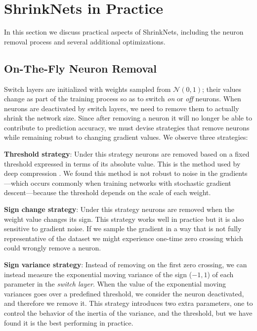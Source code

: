
\section{ShrinkNets in Practice}

In this section we discuss practical aspects of ShrinkNets, including the
neuron removal  process and several additional optimizations.

\subsection{On-The-Fly Neuron Removal}
\label{neuron_killing}

Switch layers are initialized with weights sampled from $\mathcal{N}(0,1)$;
their values change as part of the training process so as to switch \emph{on}
or \emph{off} neurons. When neurons are deactivated by switch layers, we need
to remove them to actually shrink the network size. Since after removing a
neuron it will no longer be able to contribute to  prediction accuracy, we
must devise strategies that remove neurons while remaining robust to changing
gradient values. We observe three strategies:

\textbf{Threshold strategy}: Under this strategy neurons are removed based on
a fixed threshold expressed in terms of its absolute value. This is the method
used by deep compression \cite{}. We found this method is not robust to noise
in the gradients---which occurs commonly when training networks with
stochastic gradient descent---because the threshold depends on the scale of
each weight.

\textbf{Sign change strategy}: Under this strategy neurons are removed when the
weight value changes its sign. This strategy works well in practice but it is
also sensitive to gradient noise. If we sample the gradient in a way that is
not fully representative of the dataset we might experience one-time zero
crossing which could wrongly remove a neuron.

\textbf{Sign variance strategy}: Instead of removing on the first zero
crossing, we can instead measure the exponential moving variance of the sign
($-1, 1$) of each parameter in the \textit{switch layer}. When the value of
the exponential moving variances goes over a predefined threshold, we consider
the neuron deactivated, and therefore we remove it. This strategy introduces
two extra parameters, one to control the behavior of the inertia of the
variance, and the threshold, but we have found it is the best performing in
practice.


